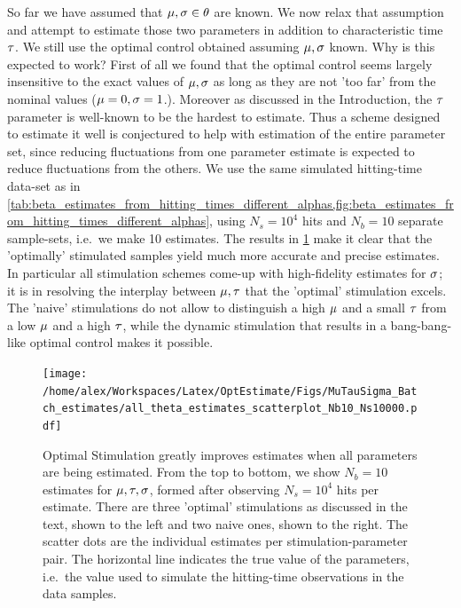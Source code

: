 \documentclass{article}
\begin{document}
So far we have assumed that $\mu, {\sigma } \in {\theta}$ are known. We now relax that
assumption and attempt to estimate those two parameters in addition to
characteristic time ${ \tau }$. We still use the optimal control obtained assuming
${\mu },{\sigma }$ known. Why is this expected to work? First of all we found that the
optimal control seems largely insensitive to the exact values of ${\mu },{\sigma }$ as long
as they are not 'too far' from the nominal values (${\mu }=0, {\sigma }=1$.). Moreover as
discussed in the Introduction, the ${ \tau }$ parameter is well-known to be the
hardest to estimate. Thus a scheme designed to estimate it well is conjectured
to help with estimation of the entire parameter set, since reducing fluctuations
from one parameter estimate is expected to reduce fluctuations from the others.
We use the same simulated hitting-time data-set as in
\cref{tab:beta_estimates_from_hitting_times_different_alphas,fig:beta_estimates_from_hitting_times_different_alphas},
using $N_s=10^4$ hits and $N_b=10$ separate sample-sets, i.e.\ we make 10
estimates. The results in \cref{fig:all_theta_estimates_batch} make it clear
that the 'optimally' stimulated samples yield much more accurate and precise
estimates. In particular all stimulation schemes come-up with high-fidelity
estimates for ${\sigma }$; it is in resolving the interplay between ${\mu },{ \tau }$ that the
'optimal' stimulation excels. The 'naive' stimulations do not
allow to distinguish a high ${\mu }$ and a small ${ \tau }$ from a low ${\mu }$ and a high
${ \tau }$, while the dynamic stimulation that results in a bang-bang-like optimal
control makes it possible. \begin{figure}[htp]
\begin{center}
  \texttt{[image: /home/alex/Workspaces/Latex/OptEstimate/Figs/MuTauSigma\_Batch\_estimates/all\_theta\_estimates\_scatterplot\_Nb10\_Ns10000.pdf]}
  \caption[Batch estimates for all 3 parameters]{Optimal Stimulation greatly
  improves estimates when all parameters are being estimated. 
  From the top to bottom, we show $N_b=10$ estimates for ${\mu },{ \tau },{\sigma }$,
  formed after observing $N_s=10^4$ hits per estimate. There are three 'optimal'
  stimulations as discussed in the text, shown to the left and two naive ones,
  shown to the right. The scatter dots are the individual estimates per
  stimulation-parameter pair. The horizontal line indicates the true value of
  the parameters, i.e.\ the value used to simulate the hitting-time observations
  in the data samples.}
  \label{fig:all_theta_estimates_batch}
\end{center}
\end{figure}
\end{document}
